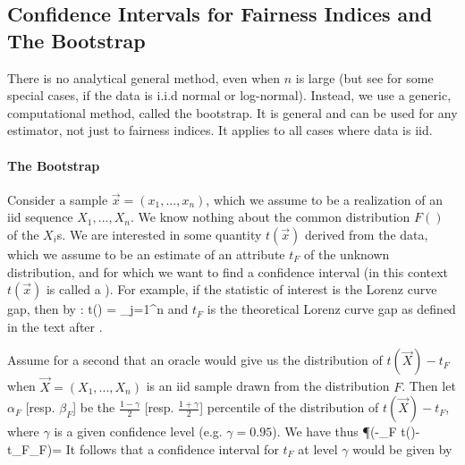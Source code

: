 \subsection{Confidence Intervals for Fairness Indices and The Bootstrap}
There is no analytical general method, even when
$n$ is large (but see \cite{verrill2003cbn} for
some special cases, if the data is i.i.d normal
or log-normal). Instead, we use a generic,
computational method, called the bootstrap. It is
general and can be used for any estimator, not
just to fairness indices. It applies to all cases
where data is iid.

\paragraph{The Bootstrap}

Consider a sample $\vec{x}=(x_1,...,x_n)$, which we assume to
be a realization of an iid sequence $X_1, ..., X_n$. We know
nothing about the common distribution $F()$ of the $X_i$s. We
are interested in some quantity $t(\vec{x})$ derived from the
data, which we assume to be an estimate of an attribute $t_F$ of the 
unknown distribution, and for which we want to find a confidence interval (in this
context $t(\vec{x})$ is called a ). For example,
if the statistic of interest is the Lorenz curve gap, then by
:
 \ben
 t() = \sum_{j=1}^n 
 \een
 and $t_F$ is the theoretical Lorenz curve gap as defined in the text after .


Assume for a second that an oracle would give us the distribution of $t(\vec{X})-t_F$ when $\vec{X}=(X_1,...,X_n)$ is an iid sample drawn from the distribution $F$. Then let $\alpha_F$ [resp. $\beta_F$] be the $\frac{1-\gamma}{2}$ [resp. $\frac{1+\gamma}{2}$] percentile of the distribution of $t(\vec{X})-t_F$, where $\gamma$ is a given confidence level (e.g. $\gamma =0.95$). We have thus
\ben
\P(-\alpha_F \leq t()-t_F\leq \beta_F)= \gamma
\een 
It follows that a confidence interval for $t_F$ at level $\gamma$ would be given by
\een

